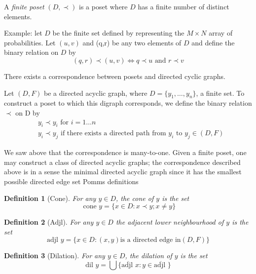\documentclass[11pt]{amsart}
\newtheorem{definition}{Definition}
\begin{document}
A \textit{finite poset} $(D,\prec)$ is a poset where $D$ has a finite number of distinct elements. 

Example: let $D$ be the finite set defined by representing the $M \times N$ array of probabilities. Let $(u,v)$ and (q,r) be any two elements of $D$ and define the binary relation on $D$ by
\begin{equation}
(q,r) \prec (u,v) \iff q \prec u \text{ and } r \prec v
\end{equation}

There exists a correspondence between posets and directed cyclic graphs. 

Let $(D, F)$ be a directed acyclic graph, where $D = \{y_1, \ldots, y_n\}$, a finite set. To construct a poset to which this digraph corresponds, we define the binary relation $\prec$ on D by
\begin{align}
&y_i \prec y_i \text{ for } i= 1\dots n \\ 
&y_i \prec y_j \text{ if there exists a directed path from } y_i \text{ to } y_j \in (D,F)
\end{align}

We saw above that the correspondence is many-to-one. Given a finite poset, one may construct a class of directed acyclic graphs; the correspondence described above is in a sense the minimal directed acyclic graph since it has the smallest possible directed edge set
Pomms definitions 


\begin{definition}[Cone]
For any $y \in D$, the \textit{cone} of $y$ is the set
\begin{equation}
\text{ cone } y = \{x \in D: x\prec y;x\neq y \} \nonumber
\end{equation}
\end{definition}

\begin{definition}[Adjl]
For any $y \in D$ the \textit{adjacent lower neighbourhood} of $y$ is the set $$
\text{adjl } y = \{ x \in D:(x,y) \text{is a directed edge in} (D,F)\}
$$
\end{definition}

\begin{definition}[Dilation]
For any $y \in D$, the \textit{dilation} of $y$ is the set 
\begin{equation}
\text{dil } y = \bigcup\{ \overline{\text{adjl }} x : y \in \overline{\text{adjl }} \} \nonumber
\end{equation}
\end{definition}
\end{document}
